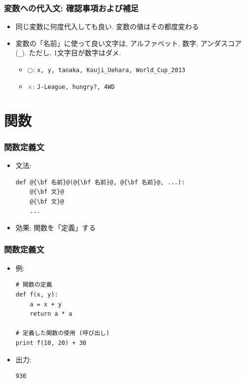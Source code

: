 \documentclass[10pt,dvipdfmx]{beamer}
\newcommand{\ao}[1]{{\color{blue}#1}}
\begin{document}
\begin{frame}
\frametitle{変数への代入文: 確認事項および補足}
\begin{itemize}
\item 同じ変数に何度代入しても良い. 変数の値はその都度変わる
\item 変数の「名前」に使って良い文字は, 
\ao{アルファベット, 数字, アンダスコア({\tt \_})}.
ただし, 1文字目が数字はダメ.
\begin{itemize}
\item $\bigcirc$: {\tt x, y, tanaka, Kouji\_Uehara, World\_Cup\_2013}
\item $\times$: {\tt J-League, hungry?, 4WD}
\end{itemize}
\end{itemize}
\end{frame}

\section{関数}

\begin{frame}[fragile]
\frametitle{関数定義文}
\begin{itemize}
\item 文法:
\begin{lstlisting}
def @{\bf 名前}@(@{\bf 名前}@, @{\bf 名前}@, ...):
    @{\bf 文}@
    @{\bf 文}@
    ...
\end{lstlisting}
\item 効果: 関数を「定義」する
\end{itemize}
\end{frame}

\begin{frame}[fragile]
\frametitle{関数定義文}
\begin{itemize}
\item 例:
\begin{lstlisting}
# 関数の定義
def f(x, y):
    a = x + y
    return a * a

# 定義した関数の使用 (呼び出し)
print f(10, 20) + 30
\end{lstlisting}
\item<2> 出力:
\begin{lstlisting}
930
\end{lstlisting}
\end{itemize}
\end{frame}
\end{document}
